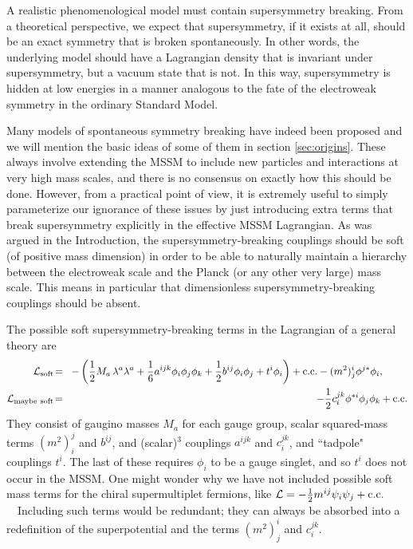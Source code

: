 \documentclass[12pt]{article}
\def\beq{\begin{eqnarray}}
\def\eeq{\end{eqnarray}}
\def\lagr{{\cal L}}
\def\conj{{{\rm c.c.}}}
\def\half{{1\over 2}}
\begin{document}
A realistic phenomenological model must contain supersymmetry breaking.
From a theoretical perspective, we expect that supersymmetry, if it exists
at all, should be an exact symmetry that is broken spontaneously. In other
words, the underlying model should have a Lagrangian density that is
invariant under supersymmetry, but a vacuum state that is not. In this
way, supersymmetry is hidden at low energies in a manner analogous
to the fate of the electroweak symmetry in the ordinary Standard Model. 

Many models of spontaneous symmetry breaking have indeed been proposed and
we will mention the basic ideas of some of them in section
\ref{sec:origins}. These always involve extending the MSSM to include new
particles and interactions at very high mass scales, and there is no
consensus on exactly how this should be done. However, from a practical
point of view, it is extremely useful to simply parameterize our ignorance
of these issues by just introducing extra terms that break supersymmetry
explicitly in the effective MSSM Lagrangian. As was argued in the
Introduction, the supersymmetry-breaking couplings should be soft (of
positive mass dimension) in order to be able to naturally maintain a
hierarchy between the electroweak scale and the Planck (or any other very
large) mass scale. This means in particular that dimensionless 
supersymmetry-breaking couplings should be absent.

The possible soft supersymmetry-breaking terms in the Lagrangian of a
general theory are
\beq
\lagr_{\rm soft}\! &=& \!
-\left (
\half M_a\, \lambda^a\lambda^a 
+ {1\over 6}a^{ijk} \phi_i\phi_j\phi_k 
+ \half b^{ij} \phi_i\phi_j 
+ t^i \phi_i \right )
+ \conj 
- (m^2)_j^i \phi^{j*} \phi_i , \phantom{xxxx}
\label{lagrsoft}
\\
\lagr_{{\rm maybe}\>\,{\rm soft}}\! &=& \!
-{1\over 2}c_i^{jk} \phi^{*i}\phi_j\phi_k + \conj
\label{lagrsoftprime}
\eeq
They consist of gaugino masses $M_a$ for each gauge group, scalar
squared-mass terms $(m^2)_i^j$ and $b^{ij}$, and (scalar)$^3$ couplings
$a^{ijk}$ and $c_i^{jk}$, and ``tadpole" couplings $t^i$. The last of
these requires $\phi_i$ to be a gauge singlet, and so $t^i$ does not occur 
in the MSSM. One might wonder why we have not included possible soft mass
terms for the chiral supermultiplet fermions, like ${\cal L} = -\half
m^{ij} \psi_i \psi_j + {\rm c.c.}$~~Including such terms would be
redundant; they can always be absorbed into a redefinition of the
superpotential and the terms $(m^2)_j^{i}$ and $c_i^{jk}$. 
\end{document}
